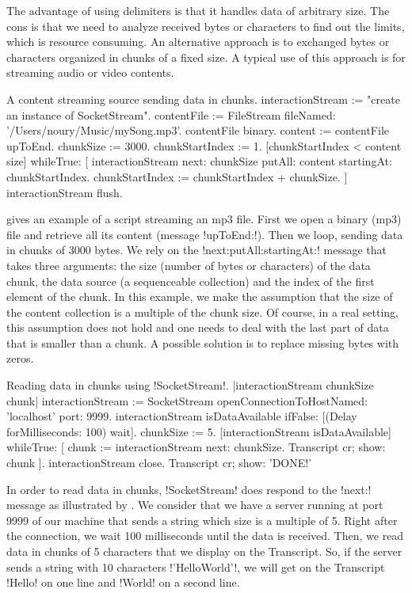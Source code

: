 \documentclass[a4paper,10pt,twoside]{book}
\begin{document}
The advantage of using delimiters is that it handles data of arbitrary size.
The cons is that we need to analyze received bytes or characters to find out the limits, which is resource consuming.
An alternative approach is to exchanged bytes or characters organized in chunks of a fixed size.
A typical use of this approach is for streaming audio or video contents.

\begin{script}{A content streaming source sending data in chunks.}
interactionStream := "create an instance of SocketStream". 
contentFile := FileStream fileNamed: '/Users/noury/Music/mySong.mp3'.
contentFile binary.
content := contentFile upToEnd.
chunkSize := 3000.
chunkStartIndex := 1.
[chunkStartIndex < content size] whileTrue: [
	interactionStream next: chunkSize putAll: content startingAt: chunkStartIndex.
	chunkStartIndex := chunkStartIndex + chunkSize.
]
interactionStream flush.
\end{script}

 gives an example of a script streaming an mp3 file.
First we open a binary (mp3) file and retrieve all its content (message \ct!upToEnd:!).
Then we loop, sending data in chunks of 3000 bytes.
We rely on the \ct!next:putAll:startingAt:! message that takes three arguments: the size (number of bytes or characters) of the data chunk,
the data source (a sequenceable collection) and the index of the first element of the chunk.
In this example, we make the assumption that the size of the content collection is a multiple of the chunk size.
Of course, in a real setting, this assumption does not hold and one needs to deal with the last part of data that is smaller than a chunk.
A possible solution is to replace missing bytes with zeros.

\begin{script}{Reading data in chunks using \ct!SocketStream!.}
	|interactionStream chunkSize chunk|
	interactionStream := SocketStream 
											openConnectionToHostNamed: 'localhost' port: 9999.
	interactionStream isDataAvailable ifFalse: [(Delay forMilliseconds: 100) wait].
	chunkSize := 5.
	[interactionStream isDataAvailable] whileTrue: [
		chunk  :=  interactionStream next: chunkSize.
		Transcript cr; show: chunk
	].
	interactionStream close.
	Transcript cr; show: 'DONE!'
\end{script}


In order to read data in chunks, \ct!SocketStream! does respond to the \ct!next:! message as illustrated by .
We consider that we have a server running at port 9999 of our machine that sends a string which size is a multiple of 5.
Right after the connection, we wait 100 milliseconds until the data is received.
Then, we read data in chunks of 5 characters that we display on the Transcript.
So, if the server sends a string with 10 characters \ct!'HelloWorld'!, we will get on the Transcript \ct!Hello! on one line and \ct!World! on a second line.
\end{document}
